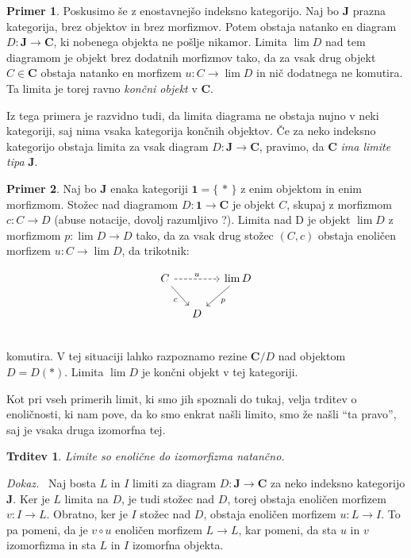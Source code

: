 \documentclass[12pt,a4paper]{book}
\theoremstyle{definition}
\theoremstyle{plain}
\newtheorem{trditev}[definicija]{Trditev}
\newenvironment{dokaz}{\emph{Dokaz.}\ }{\hspace{\fill}{$\Box$}}
\theoremstyle{definition}
\newtheorem{primer}{Primer}[section]
\theoremstyle{remark}
\newcommand{\cat}[1]{\textbf{#1}}
\renewcommand{\set}[1]{\{\,#1\,\}}
\begin{document}
\begin{primer}
Poskusimo še z enostavnejšo indeksno kategorijo. Naj bo $\cat{J}$ prazna kategorija, brez objektov in brez morfizmov. Potem obstaja natanko en diagram $D : \cat{J} \to \cat{C}$, ki nobenega objekta ne pošlje nikamor. Limita $\lim D$ nad tem diagramom je objekt brez dodatnih morfizmov tako, da za vsak drug objekt $C \in \cat{C}$ obstaja natanko en morfizem $u : C \to \lim D$ in nič dodatnega ne komutira. Ta limita je torej ravno \emph{končni objekt} v $\cat{C}$.
\end{primer}
Iz tega primera je razvidno tudi, da limita diagrama ne obstaja nujno v neki kategoriji, saj nima vsaka kategorija končnih objektov. Če za neko indeksno kategorijo obstaja limita za vsak diagram $D : \cat{J} \to \cat{C}$, pravimo, da $\cat{C}$ \emph{ima limite tipa} $\cat{J}$.

\begin{primer}
Naj bo $\cat{J}$ enaka kategoriji $\cat{1} = \set{\ast}$ z enim objektom in enim morfizmom. Stožec nad diagramom $D : \cat{1} \to \cat{C}$ je objekt $C$, skupaj z morfizmom $c : C \to D$ (abuse notacije, dovolj razumljivo ?). Limita nad D je objekt $\lim D$ z morfizmom $p : \lim D \to D$ tako, da za vsak drug stožec $(C, c)$ obstaja enoličen morfizem $u : C \to \lim D$, da trikotnik:

$$\begin{tikzcd}[column sep=small]
C \ar[dr, "c"'] \ar[rr, dashed, "u"] & & \lim D \ar[dl, "p"] \\
& D & \\
\end{tikzcd}$$
komutira. V tej situaciji lahko razpoznamo rezine $\cat{C}/D$ nad objektom $D = D(\ast)$. Limita $\lim D$ je končni objekt v tej kategoriji.
\end{primer}

Kot pri vseh primerih limit, ki smo jih spoznali do tukaj, velja trditev o enoličnosti, ki nam pove, da ko smo enkrat našli limito, smo že našli "`ta pravo"', saj je vsaka druga izomorfna tej.
\begin{trditev}
Limite so enolične do izomorfizma natančno.
\end{trditev}
\begin{dokaz}
Naj bosta $L$ in $I$ limiti za diagram $D : \cat{J} \to \cat{C}$ za neko indeksno kategorijo $\cat{J}$. Ker je $L$ limita na $D$, je tudi stožec nad $D$, torej obstaja enoličen morfizem $v : I \to L$. Obratno, ker je $I$ stožec nad $D$, obstaja enoličen morfizem $u : L \to I$. To pa pomeni, da je $v \circ u$ enoličen morfizem $L \to L$, kar pomeni, da sta $u$ in $v$ izomorfizma in sta $L$ in $I$ izomorfna objekta.
\end{dokaz}
\end{document}
